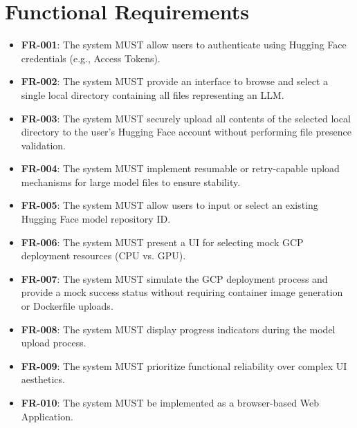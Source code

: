 \documentclass[a4paper,12pt]{report}
\begin{document}
\section{Functional Requirements}
\begin{itemize}
    \item \textbf{FR-001}: The system MUST allow users to authenticate using Hugging Face credentials (e.g., Access Tokens).
    \item \textbf{FR-002}: The system MUST provide an interface to browse and select a single local directory containing all files representing an LLM.
    \item \textbf{FR-003}: The system MUST securely upload all contents of the selected local directory to the user's Hugging Face account without performing file presence validation.
    \item \textbf{FR-004}: The system MUST implement resumable or retry-capable upload mechanisms for large model files to ensure stability.
    \item \textbf{FR-005}: The system MUST allow users to input or select an existing Hugging Face model repository ID.
    \item \textbf{FR-006}: The system MUST present a UI for selecting mock GCP deployment resources (CPU vs. GPU).
    \item \textbf{FR-007}: The system MUST simulate the GCP deployment process and provide a mock success status without requiring container image generation or Dockerfile uploads.
    \item \textbf{FR-008}: The system MUST display progress indicators during the model upload process.
    \item \textbf{FR-009}: The system MUST prioritize functional reliability over complex UI aesthetics.
    \item \textbf{FR-010}: The system MUST be implemented as a browser-based Web Application.
\end{itemize}
\end{document}
